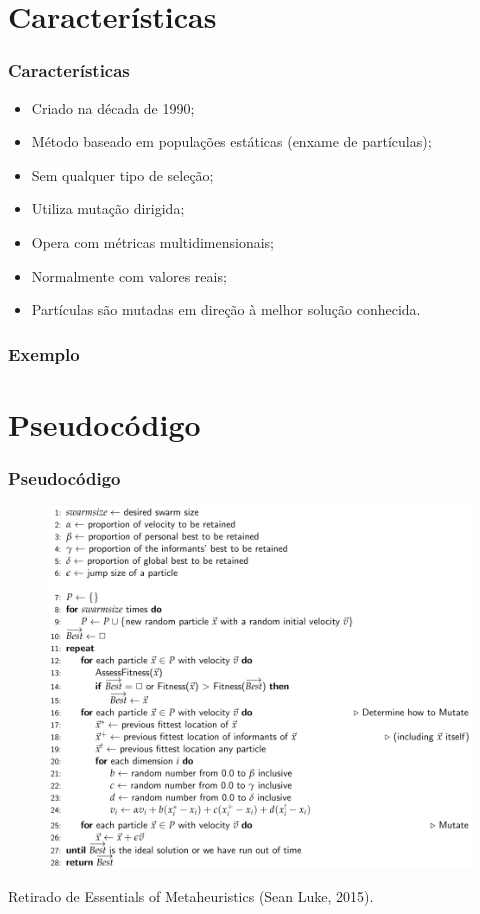 \documentclass{beamer}
\begin{document}
\section{Características} 

\begin{frame}
\frametitle{Características}
\begin{itemize}
\item Criado na década de 1990;
\item Método baseado em populações estáticas (enxame de partículas);
\item Sem qualquer tipo de seleção;
\item Utiliza mutação dirigida;
\item Opera com métricas multidimensionais;
\item Normalmente com valores reais;
\item Partículas são mutadas em direção à melhor solução conhecida.
\end{itemize}
\end{frame}

\begin{frame}
 \frametitle{Exemplo}
\end{frame}


\section{Pseudocódigo}

\begin{frame}
\frametitle{Pseudocódigo}
\begin{figure}
\includegraphics[width=0.65\linewidth]{psocode.png}
\end{figure}
\footnotesize{
Retirado de Essentials of Metaheuristics (Sean Luke, 2015).
}
\end{frame}
\end{document}

